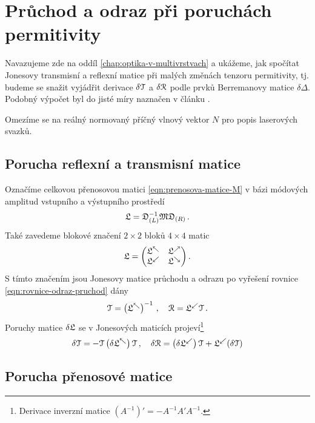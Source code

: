 \section{Průchod a odraz při poruchách permitivity}
\label{app:berreman}

Navazujeme zde na oddíl \ref{chap:optika-v-multivrstvach} a ukážeme, jak spočítat Jonesovy transmisní a reflexní matice při malých změnách tenzoru permitivity, tj. budeme se snažit vyjádřit derivace $\delta\mathcal{T}$ a $\delta\mathcal{R}$ podle prvků Berremanovy matice $\delta\Delta$.
Podobný výpočet byl do jisté míry naznačen v článku \cite{bertrandGeneralAnalyticalTreatment2001}.

Omezíme se na reálný normovaný příčný vlnový vektor $N$ pro popis laserových svazků.

\subsection*{Porucha reflexní a transmisní matice}

Označíme celkovou přenosovou matici \eqref{eqn:prenosova-matice-M} v bázi módových amplitud vstupního a výstupního prostředí
\begin{equation}
    \mathfrak{L} = \mathfrak{D}_{(L)}^{-1} \mathfrak{M}  \mathfrak{D}_{(R)} \,.
\end{equation}
Také zavedeme blokové značení $2\times2$ bloků $4\times4$ matic
\begin{equation}
    \mathfrak{L} = \begin{pmatrix} \mathfrak{L}^\nwarrow & \mathfrak{L}^\nearrow \\
    \mathfrak{L}^\swarrow & \mathfrak{L}^\searrow \end{pmatrix} .
\end{equation}
S tímto značením jsou Jonesovy matice průchodu a odrazu po vyřešení rovnice \eqref{eqn:rovnice-odraz-pruchod} dány
\begin{equation}
    \mathcal{T} = \left(\mathfrak{L}^\nwarrow\right)^{-1} \,, \quad \mathcal{R}=\mathfrak{L}^\swarrow \mathcal{T} \,.
\end{equation}
Poruchy matice $\delta\mathfrak{L}$ se v Jonesových maticích projeví\footnote{Derivace inverzní matice $(A^{-1})'=-A^{-1}A'A^{-1}$.}
\begin{equation}
    \label{eqn:app-derivace-RT}
    \delta\mathcal{T} = -\mathcal{T} \left(\delta\mathfrak{L}^\nwarrow \right) \mathcal{T} \,, \quad \delta\mathcal{R}=\left(\delta\mathfrak{L}^\swarrow\right) \mathcal{T} + \mathfrak{L}^\swarrow (\delta\mathcal{T})
\end{equation}

\subsection*{Porucha přenosové matice}
